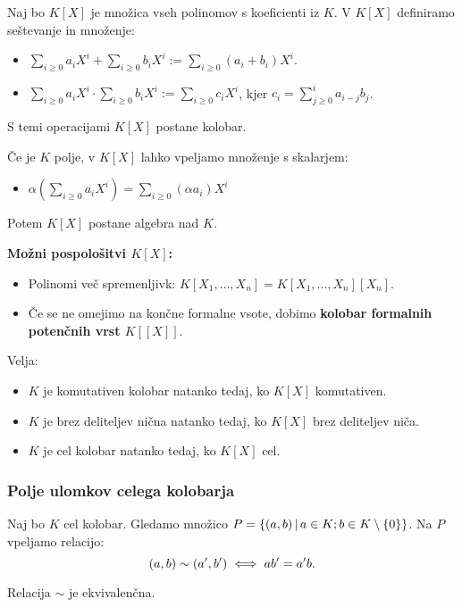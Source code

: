 Naj bo $K[X]$ je množica vseh polinomov s koeficienti iz $K$. V $K[X]$ definiramo seštevanje in množenje:
\begin{itemize}
    \item $\sum_{i \geq 0} a_iX^i + \sum_{i \geq 0} b_iX^i := \sum_{i \geq 0} (a_i + b_i)X^i$.
    \item $\sum_{i \geq 0} a_iX^i \cdot \sum_{i \geq 0} b_iX^i := \sum_{i \geq 0} c_iX^i$, kjer $c_i = \sum_{j \geq 0}^{i} a_{i - j} b_j$.
\end{itemize}
S temi operacijami $K[X]$ postane kolobar.
\begin{opomba}
    Če je $K$ polje, v $K[X]$ lahko vpeljamo množenje s skalarjem:
    \begin{itemize}
        \item $\alpha (\sum_{i \geq 0} a_iX^i) = \sum_{i \geq 0} (\alpha a_i)X^i$
    \end{itemize} 
    Potem $K[X]$ postane algebra nad $K$.
\end{opomba}
\textbf{Možni pospološitvi $K[X]$:}
\begin{itemize}
    \item Polinomi več spremenljivk: $K[X_1, \ldots, X_n] = K[X_1, \ldots, X_n][X_n]$.
    \item Če se ne omejimo na končne formalne vsote, dobimo \textbf{kolobar formalnih potenčnih vrst $K[[X]]$}.
\end{itemize}     

\begin{trditev}
    Velja:
    \begin{itemize}
        \item $K$ je komutativen kolobar natanko tedaj, ko $K[X]$ komutativen.
        \item $K$ je brez deliteljev nična natanko tedaj, ko $K[X]$ brez deliteljev niča.
        \item $K$ je cel kolobar natanko tedaj, ko $K[X]$ cel.
    \end{itemize}
\end{trditev}

\subsubsection*{Polje ulomkov celega kolobarja}    
Naj bo $K$ cel kolobar. Gledamo množico $P = \{(a,b) \,|\, a \in K; b \in K \setminus \{0\}\}$. Na $P$ vpeljamo relacijo:
$$(a, b) \sim (a', b') \iff ab' = a'b.$$

\begin{trditev}
    Relacija $\sim$ je ekvivalenčna.
\end{trditev}

